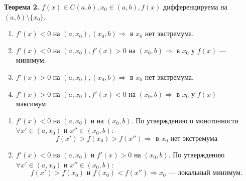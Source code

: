 \documentclass[12pt, a4paper]{article}
\begin{document}
\begin{center}
\end{center}

\textbf{Теорема 2.} $f(x) \in C(a, b), x_0 \in (a, b), f(x)$ дифференцируема на $(a, b)\setminus \{x_0\}$.
\begin{enumerate}
	\item $f'(x) < 0$ на $(a, x_0), (x_0, b) \Rightarrow$ в $x_0$ нет экстремума. 
	\item $f'(x) < 0$ на $(a, x_0), f'(x) > 0$ на $(x_0, b) \Rightarrow$ в $x_0$ у $f(x)$ — минимум.
	\item $f'(x) > 0$ на $(a, x_0), (x_0, b) \Rightarrow$ в $x_0$ нет экстремума. 
	\item $f'(x) > 0$ на $(a, x_0), f'(x) < 0$ на $(x_0, b) \Rightarrow$ в $x_0$ у $f(x)$ — максимум.
\end{enumerate}
\begin{tcolorbox}[title=Доказательство]
	\begin{enumerate}
		\item $f'(x) < 0$ на $(a, x_0)$ и на $(x_0, b)$. По утверждению о монотонности $\forall x' \in (a, x_0)$ и $x'' \in (x_0, b)$:
			\[ f(x') > f(x_0) > f(x'') \Rightarrow \text{ в } x_0 \text{ нет экстремума} \]
		\item $f'(x) < 0$ на $(a, x_0)$ и $f'(x) > 0$ на $(x_0, b)$. По утверждению $\forall x' \in (a, x_0)$ и $x'' \in (x_0, b)$:
			\[ f(x') > f(x_0)\text{ и } f(x_0) < f(x'') \Rightarrow x_0 \text{ — локальный минимум}.\]
	\end{enumerate}
\end{tcolorbox}
\end{document}
